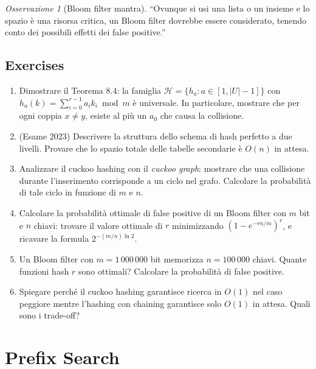 \documentclass[12pt, a4paper, oneside]{book}
\theoremstyle{plain}
\theoremstyle{definition}
\theoremstyle{remark}
\newtheorem{osservazione}[teorema]{Osservazione}
\begin{document}
\begin{osservazione}[Bloom filter mantra]
``Ovunque si usi una lista o un insieme e lo spazio è una risorsa critica, un Bloom filter dovrebbe essere considerato, tenendo conto dei possibili effetti dei false positive.''
\end{osservazione}

\section{Exercises}

\begin{enumerate}
  \item Dimostrare il Teorema 8.4: la famiglia $\mathcal{H} = \{h_a : a \in [1, |U|-1]\}$ con $h_a(k) = \sum_{i=0}^{r-1} a_i k_i \bmod m$ è universale. In particolare, mostrare che per ogni coppia $x \ne y$, esiste al più un $a_0$ che causa la collisione.

  \item (Esame 2023) Descrivere la struttura dello schema di hash perfetto a due livelli. Provare che lo spazio totale delle tabelle secondarie è $O(n)$ in attesa.

  \item Analizzare il cuckoo hashing con il \emph{cuckoo graph}: mostrare che una collisione durante l'inserimento corrisponde a un ciclo nel grafo. Calcolare la probabilità di tale ciclo in funzione di $m$ e $n$.

  \item Calcolare la probabilità ottimale di false positive di un Bloom filter con $m$ bit e $n$ chiavi: trovare il valore ottimale di $r$ minimizzando $(1 - e^{-rn/m})^r$, e ricavare la formula $2^{-(m/n)\ln 2}$.

  \item Un Bloom filter con $m = 1\,000\,000$ bit memorizza $n = 100\,000$ chiavi. Quante funzioni hash $r$ sono ottimali? Calcolare la probabilità di false positive.

  \item Spiegare perché il cuckoo hashing garantisce ricerca in $O(1)$ nel caso peggiore mentre l'hashing con chaining garantisce solo $O(1)$ in attesa. Quali sono i trade-off?
\end{enumerate}

\chapter{Prefix Search}
\end{document}
